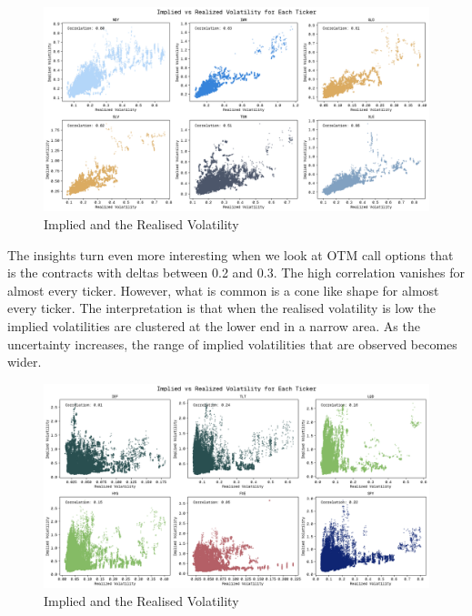\begin{figure}[H]
    \centering
    \includegraphics[width=1\textwidth]{images/iv_and_rv_batch2.png}
    \caption{Implied and the Realised Volatility}
    \label{fig:iv_and_rv2}
\end{figure}

The insights turn even more interesting when we look at OTM call options that is the contracts with deltas between 0.2 and 0.3. The high correlation vanishes for almost every ticker. However, what is common is a cone like shape for almost every ticker. The interpretation is that when the realised volatility is low the implied volatilities are clustered at the lower end in a narrow area. As the uncertainty increases, the range of implied volatilities that are observed becomes wider. 

\begin{figure}[H]
    \centering
    \includegraphics[width=1\textwidth]{images/iv_and_rv_otm_batch1.png}
    \caption{Implied and the Realised Volatility}
    \label{fig:iv_and_rv__otm_1}
\end{figure}

